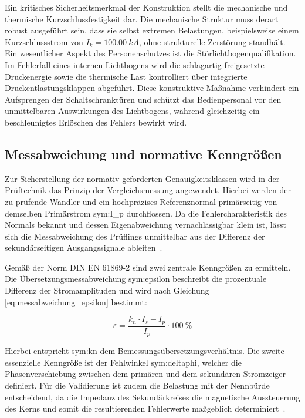 Ein kritisches Sicherheitsmerkmal der Konstruktion stellt die mechanische und thermische Kurzschlussfestigkeit dar. Die mechanische Struktur muss derart robust ausgeführt sein, dass sie selbst extremen Belastungen, beispielsweise einem Kurzschlussstrom von $I_k = \SI{100,00}{kA}$, ohne strukturelle Zerstörung standhält. Ein wesentlicher Aspekt des Personenschutzes ist die Störlichtbogenqualifikation. Im Fehlerfall eines internen Lichtbogens wird die schlagartig freigesetzte Druckenergie sowie die thermische Last kontrolliert über integrierte Druckentlastungsklappen abgeführt. Diese konstruktive Maßnahme verhindert ein Aufsprengen der Schaltschranktüren und schützt das Bedienpersonal vor den unmittelbaren Auswirkungen des Lichtbogens, während gleichzeitig ein beschleunigtes Erlöschen des Fehlers bewirkt wird.





\subsection{Messabweichung und normative Kenngrößen}
\label{sec:messabweichung_kenngroessen}

Zur Sicherstellung der normativ geforderten Genauigkeitsklassen wird in der Prüftechnik das Prinzip der Vergleichsmessung angewendet. Hierbei werden der zu prüfende Wandler und ein hochpräzises Referenznormal primärseitig von demselben Primärstrom \gls{sym:I_p} durchflossen. Da die Fehlercharakteristik des Normals bekannt und dessen Eigenabweichung vernachlässigbar klein ist, lässt sich die Messabweichung des Prüflings unmittelbar aus der Differenz der sekundärseitigen Ausgangssignale ableiten~\cite{norm-DIN_EN_61869_2-Messwandler_Teil2-DIN}.

Gemäß der Norm DIN EN 61869-2 sind zwei zentrale Kenngrößen zu ermitteln. Die Übersetzungsmessabweichung \gls{sym:epsilon} beschreibt die prozentuale Differenz der Stromamplituden und wird nach Gleichung \eqref{eq:messabweichung_epsilon} bestimmt:

\begin{equation}
    \varepsilon = \frac{k_n \cdot I_{s} - I_{p}}{I_{p}} \cdot \SI{100}{\percent}
    \label{eq:messabweichung_epsilon}
\end{equation}

Hierbei entspricht \gls{sym:kn} dem Bemessungsübersetzungsverhältnis. Die zweite essenzielle Kenngröße ist der Fehlwinkel \gls{sym:deltaphi}, welcher die Phasenverschiebung zwischen dem primären und dem sekundären Stromzeiger definiert. Für die Validierung ist zudem die Belastung mit der Nennbürde entscheidend, da die Impedanz des Sekundärkreises die magnetische Aussteuerung des Kerns und somit die resultierenden Fehlerwerte maßgeblich determiniert~\cite{norm-DIN_EN_61869_2-Messwandler_Teil2-DIN}.

